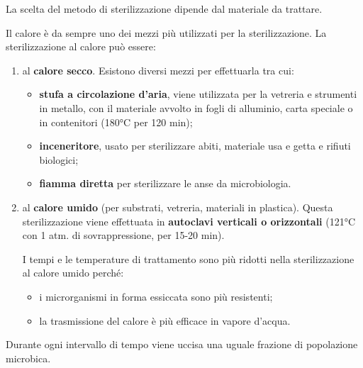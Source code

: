 \documentclass[11pt]{book}
\begin{document}
La scelta del metodo di sterilizzazione dipende dal materiale da trattare. 

Il calore è da sempre uno dei mezzi più utilizzati per la sterilizzazione. La sterilizzazione al calore può essere:
\begin{enumerate} 
\item al \textbf{calore secco}. Esistono diversi mezzi per effettuarla tra cui:
\begin{itemize}
\item \textbf{stufa a circolazione d’aria}, viene utilizzata per la vetreria e strumenti in metallo, con il materiale avvolto in fogli di alluminio, carta speciale o in contenitori (180°C per 120 min);
\item \textbf{inceneritore}, usato per sterilizzare abiti, materiale usa e getta e rifiuti biologici;
\item \textbf{fiamma diretta} per sterilizzare le anse da microbiologia.
\end{itemize} 

\item al \textbf{calore umido} (per substrati, vetreria, materiali in plastica). Questa sterilizzazione viene effettuata in \textbf{autoclavi verticali o orizzontali} (121°C con 1 atm. di sovrappressione, per 15-20 min).

I tempi e le temperature di trattamento sono più ridotti nella sterilizzazione al calore umido perché:
\begin{itemize}
\item i microrganismi in forma essiccata sono più resistenti;
\item la trasmissione del calore è più efficace in vapore d’acqua.
\end{itemize}

\end{enumerate}

Durante ogni intervallo di tempo viene uccisa una uguale frazione di popolazione microbica.
\end{document}
